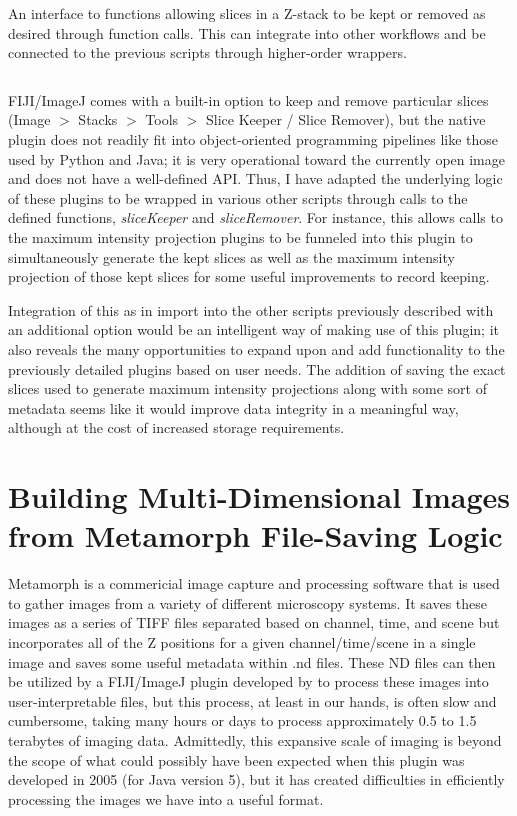 \begin{code}
\caption{An interface to functions allowing slices in a Z\hyp{}stack to be kept or removed as desired through function calls. This can integrate into other workflows and be connected to the previous scripts through higher\hyp{}order wrappers.}
\label{reslicer}

\inputminted[breaklines,frame=single,fontsize=\small]{python}{source/reSlicer.py}

\end{code}

FIJI/ImageJ comes with a built\hyp{}in option to keep and remove particular slices (Image $>$ Stacks $>$ Tools $>$ Slice Keeper / Slice Remover), but the native plugin does not readily fit into object\hyp{}oriented programming pipelines like those used by Python and Java; it is very operational toward the currently open image and does not have a well\hyp{}defined API. Thus, I have adapted the underlying logic of these plugins to be wrapped in various other scripts through calls to the defined functions, \textit{sliceKeeper} and \textit{sliceRemover}. For instance, this allows calls to the maximum intensity projection plugins to be funneled into this plugin to simultaneously generate the kept slices as well as the maximum intensity projection of those kept slices for some useful improvements to record keeping. 

Integration of this as in import into the other scripts previously described with an additional option would be an intelligent way of making use of this plugin; it also reveals the many opportunities to expand upon and add functionality to the previously detailed plugins based on user needs. The addition of saving the exact slices used to generate maximum intensity projections along with some sort of metadata seems like it would improve data integrity in a meaningful way, although at the cost of increased storage requirements.

\section{Building Multi\hyp{}Dimensional Images from Metamorph File\hyp{}Saving Logic}\label{metamorph}

Metamorph is a commericial image capture and processing software that is used to gather images from a variety of different microscopy systems. It saves these images as a series of TIFF files separated based on channel, time, and scene but incorporates all of the Z positions for a given channel/time/scene in a single image and saves some useful metadata within .nd files. These ND files can then be utilized by a FIJI/ImageJ plugin developed by \citet{Cordelieres2005} to process these images into user-interpretable files, but this process, at least in our hands, is often slow and cumbersome, taking many hours or days to process approximately 0.5 to 1.5 terabytes of imaging data. Admittedly, this expansive scale of imaging is beyond the scope of what could possibly have been expected when this plugin was developed in 2005 (for Java version 5), but it has created difficulties in efficiently processing the images we have into a useful format. 


